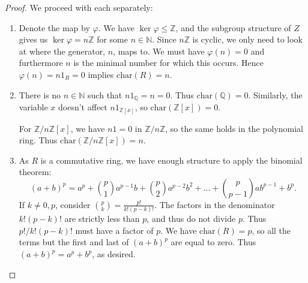 \documentclass[12pt]{article}
\theoremstyle{remark}
\theoremstyle{named}
\newcommand{\Z}{\mathbb Z}
\begin{document}
\begin{proof}
    We proceed with each separately:
    \begin{enumerate}
        \item Denote the map by \(\varphi\). We have \(\ker \varphi \le \Z\), and the subgroup structure of \(Z\) gives us \(\ker \varphi = n \Z\) for some \(n \in \mathbb N\). Since \(n \Z\) is cyclic, we only need to look at where the generator, \(n\), maps to. We must have \(\varphi(n) = 0\) and furthermore \(n\) is the minimal number for which this occurs. Hence \(\varphi(n) = n1_R = 0\) implies \(\text{char}(R) = n\).
        \item There is no \(n \in \mathbb N\) such that \(n1_{\mathbb Q} = n = 0\). Thus \(\text{char}(\mathbb Q) = 0\). Similarly, the variable \(x\) doesn't affect \(n1_{\Z[x]}\), so \(\text{char}(\Z[x]) = 0\).
        
        For \(\Z / n \Z [x]\), we have \(n1 = 0\) in \(\Z / n\Z\), so the same holds in the polynomial ring. Thus \(\text{char}(\Z / n \Z[x]) = n\).

        \item As \(R\) is a commutative ring, we have enough structure to apply the binomial theorem:
        \[(a + b)^p = a^p + \binom{p}{1}a^{p - 1}b + \binom{p}{2}a^{p - 2}b^2 + \dots + \binom{p}{p - 1}ab^{p - 1} + b^p.\] 
        If \(k \neq 0, p\), consider \(\binom{p}{k} = \frac{p!}{k!(p - k)!}\). The factors in the denominator \(k!(p - k)!\) are strictly less than \(p\), and thus do not divide \(p\). Thus \(p! / k!(p - k)!\) must have a factor of \(p\). We have \(\text{char}(R) = p\), so all the terms but the first and last of \((a + b)^p\) are equal to zero. Thus \((a + b)^p = a^p + b^p\), as desired.
    \end{enumerate}
\end{proof}
\end{document}
